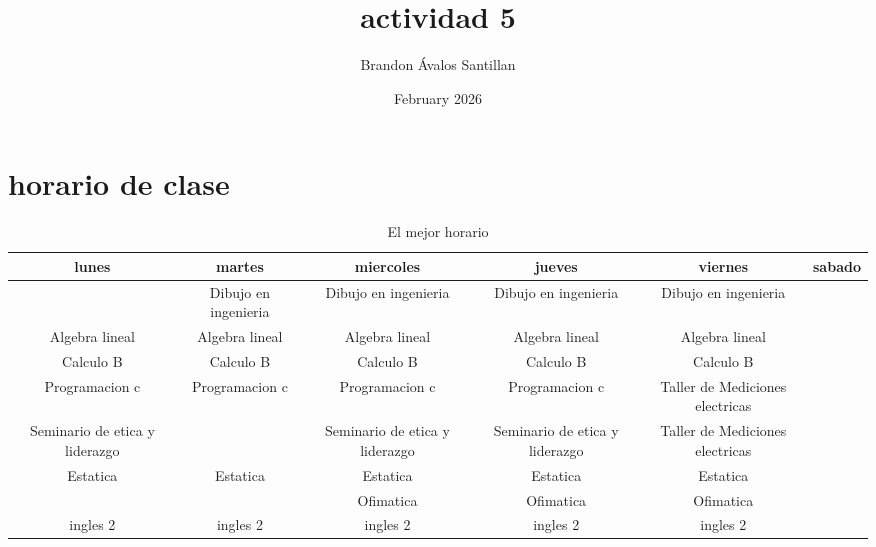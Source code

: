 \documentclass{article}
\title{actividad 5}
\author{Brandon Ávalos Santillan}
\date{February 2026}
\newcommand{\D}{Dibujo en ingenieria}
\newcommand{\A}{Algebra lineal}
\newcommand{\C}{Calculo B}
\newcommand{\PO}{Programacion c}
\newcommand{\e}{Seminario de etica y liderazgo}
\newcommand{\E}{Estatica}
\newcommand{\T}{Ofimatica}
\newcommand{\I}{ingles 2}
\newcommand{\M}{Taller de Mediciones electricas}
\newcommand{\B}{ }
\begin{document}
\maketitle

\section{horario de clase}
\begin{table}[h!]
\small
\centering
\begin{tabular}{|c|c|c|c|c|c|}
\hline
lunes & martes & miercoles& jueves&viernes&sabado\\ \hline
\B&\D& \D&\D&\D&\\ \hline
\A&\A&\A&\A&\A&\\ \hline
\C&\C&\C&\C&\C&\\ \hline
\PO&\PO&\PO&\PO&\M&\\ \hline
\e&\B&\e&\e&\M&\\ \hline
\E&\E&\E&\E&\E&\\ \hline
\B&\B&\T&\T&\T&\\ \hline
\I&\I&\I&\I&\I&\\ \hline
\end{tabular}
\caption{El mejor horario}
\label{tab:ejemplo}
\end{table}
\end{document}
